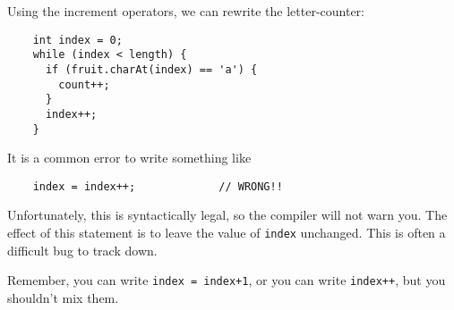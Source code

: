 \documentclass[12pt]{book}
\theoremstyle{definition}
\begin{document}
Using the increment operators, we can rewrite the letter-counter:

\begin{lstlisting}
    int index = 0;
    while (index < length) {
      if (fruit.charAt(index) == 'a') {
        count++;
      }
      index++;
    }
\end{lstlisting}
%
It is a common error to write something like

\begin{lstlisting}
    index = index++;             // WRONG!!
\end{lstlisting}
%
Unfortunately, this is syntactically legal, so the compiler
will not warn you.  The effect of this statement is to leave
the value of {\tt index} unchanged.  This is often a difficult
bug to track down.

Remember, you can write {\tt index = index+1}, or you
can write {\tt index++}, but you shouldn't mix them.





\end{document}
